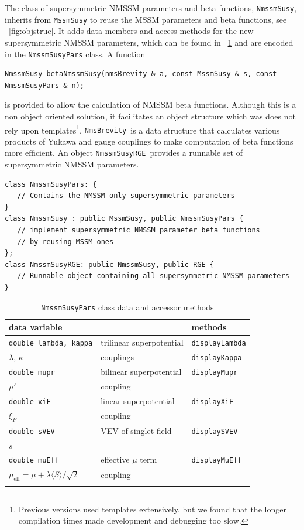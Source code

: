 \documentclass[final,3p,times]{elsarticle}
\def\code#1{\small{\tt #1}\normalsize}
\begin{document}
The class of supersymmetric NMSSM parameters and beta functions,
\code{NmssmSusy}, inherits from \code{MssmSusy} to reuse the MSSM
parameters and beta functions, see \figurename~\ref{fig:objstruc}. 
It
adds data members and access methods for the new supersymmetric NMSSM
parameters, which can be found in \tablename~\ref{tab:nmssmsusy} and are
encoded in the \code{NmssmSusyPars} class.
A function 
\begin{verbatim}
NmssmSusy betaNmssmSusy(nmsBrevity & a, const MssmSusy & s, const NmssmSusyPars & n);
\end{verbatim}
is provided to allow the calculation of NMSSM beta functions.
Although 
this is a non object oriented solution, it facilitates an object structure
which was does not rely upon templates\footnote{Previous versions used
  templates extensively, but we found that the longer compilation times made
  development and debugging too slow.}. \code{NmsBrevity}~is a data structure
that calculates various products of Yukawa and gauge couplings to make
computation of beta functions more efficient.
An object \code{NmssmSusyRGE}~provides a runnable set of supersymmetric NMSSM
parameters.
\begin{verbatim}
class NmssmSusyPars: {
   // Contains the NMSSM-only supersymmetric parameters
}
class NmssmSusy : public MssmSusy, public NmssmSusyPars {
   // implement supersymmetric NMSSM parameter beta functions
   // by reusing MSSM ones
};
class NmssmSusyRGE: public NmssmSusy, public RGE {
   // Runnable object containing all supersymmetric NMSSM parameters
}
\end{verbatim}


%
\begin{table}
  \centering
  \begin{tabular}{lll}
    data variable & & methods \\\hline
    \code{\small double lambda, kappa} & trilinear superpotential &
    \code{\small displayLambda}
    \\
    $\lambda$, $\kappa$ & couplings & \code{\small displayKappa}
    \\\hline
    \code{\small double mupr} & bilinear superpotential &
    \code{\small displayMupr}
    \\
    $\mu'$ & coupling &
    \\\hline
    \code{\small double xiF} & linear superpotential &
    \code{\small displayXiF}
    \\
    $\xi_F$ & coupling &
    \\\hline
    \code{\small double sVEV} & VEV of singlet field &
    \code{\small displaySVEV}
    \\
    $s$ & &
    \\\hline
    \code{\small double muEff} & effective $\mu$ term &
    \code{\small displayMuEff}
    \\
    $\mu_\textrm{eff}=\mu + \lambda \langle S \rangle / \sqrt{2}$ & coupling &
    \\\hline
    \normalsize
  \end{tabular}
  \caption{\code{NmssmSusyPars} class data and accessor methods
    \label{tab:nmssmsusy}}
\end{table}
\end{document}

